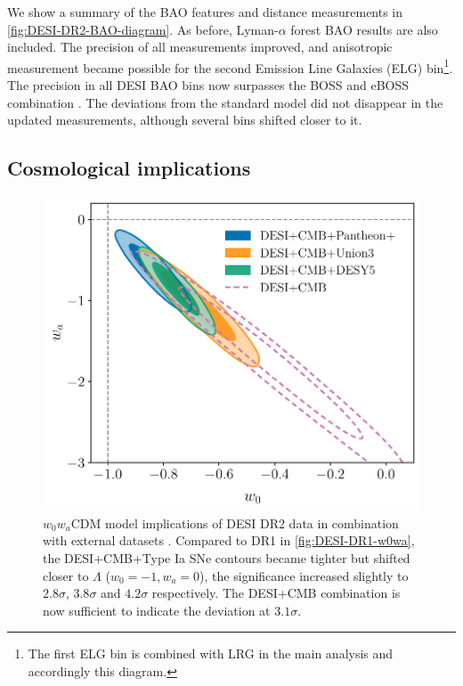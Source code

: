 We show a summary of the BAO features and distance measurements in \cref{fig:DESI-DR2-BAO-diagram}.
As before, Lyman-$\alpha$ forest BAO results \cite{DESI.DR2.BAO.lya} are also included.
The precision of all measurements improved, and anisotropic measurement became possible for the second Emission Line Galaxies (ELG) bin\footnote{The first ELG bin is combined with LRG in the main analysis and accordingly this diagram.}.
The precision in all DESI BAO bins now surpasses the BOSS and eBOSS combination \citep{DESI.DR2.BAO.cosmo,SDSS4-eBOSS-Alam21}.
The deviations from the standard model did not disappear in the updated measurements, although several bins shifted closer to it.

\subsection{Cosmological implications}

\begin{figure}[htbp]
    \centering
    \includegraphics[width=\textwidth]{DR2/w0waCDM_DESI+CMB+SNe_v3.pdf}
    \caption[$w_0w_a$CDM model implications of DESI DR2 data in combination with external datasets]{$w_0w_a$CDM model implications of DESI DR2 data in combination with external datasets \citep[figure reproduced from][]{DESI.DR2.BAO.cosmo}.
    Compared to DR1 in \cref{fig:DESI-DR1-w0wa}, the DESI+CMB+Type Ia SNe contours became tighter but shifted closer to $\Lambda$ ($w_0=-1,w_a=0$), the significance increased slightly to $2.8\sigma$, $3.8\sigma$ and $4.2\sigma$ respectively.
    The DESI+CMB combination is now sufficient to indicate the deviation at $3.1\sigma$.}
    \label{fig:DESI-DR2-w0wa}
\end{figure}

